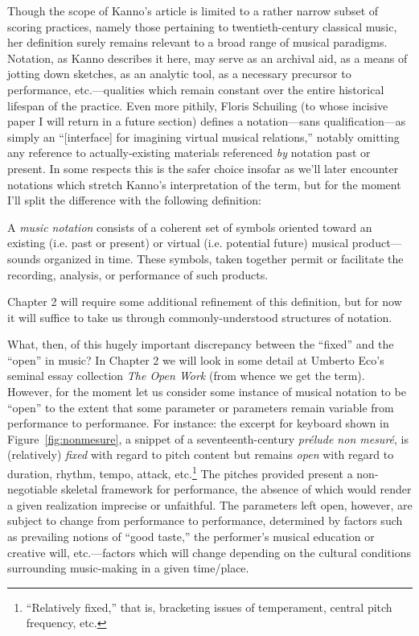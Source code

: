     Though the scope of Kanno's article is limited to a rather narrow subset of scoring practices, namely those pertaining to twentieth-century classical music, her definition surely remains relevant to a broad range of musical paradigms. Notation, as Kanno describes it here, may serve as an archival aid, as a means of jotting down sketches, as an analytic tool, as a necessary precursor to performance, etc.---qualities which remain constant over the entire historical lifespan of the practice. Even more pithily, Floris Schuiling (to whose incisive paper I will return in a future section) defines a  notation---sans qualification---as simply an ``[interface] for imagining virtual musical relations,'' notably omitting any reference to actually-existing materials referenced \textit{by} notation past or present. In some respects this is the safer choice insofar as we'll later encounter notations which stretch Kanno's interpretation of the term, but for the moment I'll split the difference with the following definition:

        \begin{smallquote}
             A \textit{music notation} consists of a coherent set of symbols oriented toward an existing (i.e. past or present) or virtual (i.e. potential future) musical product---sounds organized in time. These symbols, taken together permit or facilitate the recording, analysis, or performance of such products.
        \end{smallquote}


    \noindent Chapter 2 will require some additional refinement of this definition, but for now it will suffice to take us through commonly-understood structures of notation.

    What, then, of this hugely important discrepancy between the ``fixed'' and the ``open'' in music? In Chapter 2 we will look in some detail at Umberto Eco's seminal essay collection \textit{The Open Work} (from whence we get the term). However, for the moment let us consider some instance of musical notation to be ``open'' to the extent that some parameter or parameters remain variable from performance to performance. For instance: the excerpt for keyboard shown in Figure~\ref{fig:nonmesure}, a snippet of a seventeenth-century \textit{prélude non mesuré}, is (relatively) \textit{fixed} with regard to pitch content but remains \textit{open} with regard to duration, rhythm, tempo, attack, etc.\footnote{``Relatively fixed,'' that is, bracketing issues of temperament, central pitch frequency, etc.} The pitches provided present a non-negotiable skeletal framework for performance, the absence of which would render a given realization imprecise or unfaithful. The parameters left open, however, are subject to change from performance to performance, determined by factors such as prevailing notions of ``good taste,'' the performer's musical education or creative will, etc.---factors which will change depending on the cultural conditions surrounding music-making in a given time/place.

